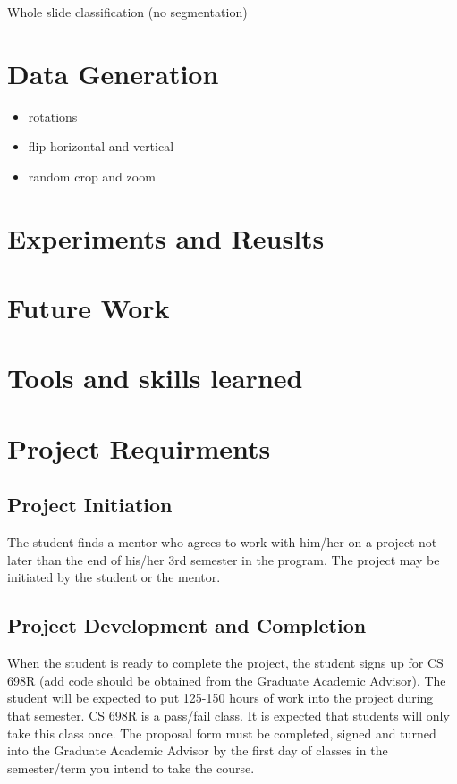 \documentclass[ms,electronic,oneside,twosidetoc,letterpaper,chaptercenter,parttop]{byumsphd}
\begin{document}
Whole slide classification (no segmentation) \cite{kiran}

\chapter{Data Generation}

\begin{itemize}
  \item rotations
  \item flip horizontal and vertical
  \item random crop and zoom
\end{itemize}


\chapter{Experiments and Reuslts}

\chapter{Future Work}

\chapter{Tools and skills learned}

\chapter{Project Requirments}

\section{Project Initiation}
The student finds a mentor who agrees to work with him/her on a project not later than the end of his/her 3rd semester in the program. The project may be initiated by the student or the mentor. 
 

\section{Project Development and Completion}

When the student is ready to complete the project, the student signs up for CS 698R (add code should be obtained from the Graduate Academic Advisor). The student will be expected to put 125-150 hours of work into the project during that semester. CS 698R is a pass/fail class. It is expected that students will only take this class once. The proposal form must be completed, signed and turned into the Graduate Academic Advisor by the first day of classes in the semester/term you intend to take the course.
\end{document}
